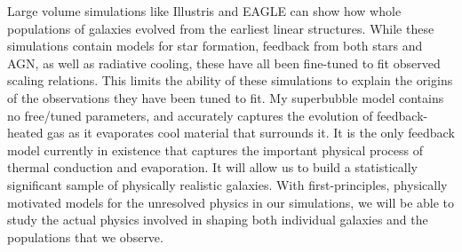 Large volume simulations like Illustris \citep{Vogelsberger2014b} and EAGLE
\citep{Schaye2015} can show how whole populations of galaxies evolved from the
earliest linear structures.  While these simulations contain models for star
formation, feedback from both stars and AGN, as well as radiative cooling, these
have all been fine-tuned to fit observed scaling relations.  This limits the
ability of these simulations to explain the origins of the observations they
have been tuned to fit.  My superbubble model contains no free/tuned parameters,
and accurately captures the evolution of feedback-heated gas as it evaporates
cool material that surrounds it.  It is the only feedback model currently in
existence that captures the important physical process of thermal conduction and
evaporation.  It will allow us to build a statistically significant sample of
physically realistic galaxies.  With first-principles, physically motivated
models for the unresolved physics in our simulations, we will be able to study
the actual physics involved in shaping both individual galaxies and the
populations that we observe. 


